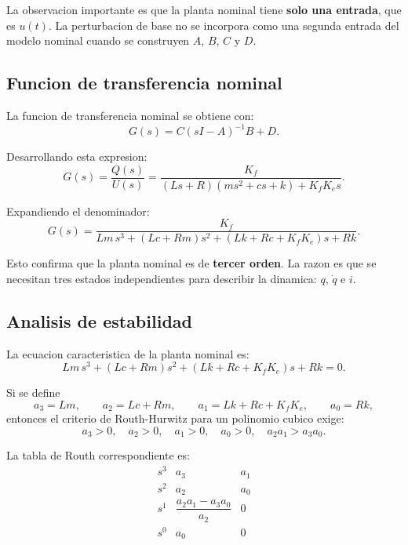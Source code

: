 \documentclass[11pt]{article}
\begin{document}
La observacion importante es que la planta nominal tiene \textbf{solo una entrada}, que es $u(t)$. La perturbacion de base no se incorpora como una segunda entrada del modelo nominal cuando se construyen $A$, $B$, $C$ y $D$.

\subsection{Funcion de transferencia nominal}

La funcion de transferencia nominal se obtiene con:
\begin{equation}
G(s)=C(sI-A)^{-1}B+D.
\end{equation}

Desarrollando esta expresion:
\begin{equation}
G(s)=\frac{Q(s)}{U(s)}
=
\frac{K_f}{(Ls+R)(ms^2+cs+k)+K_fK_e s}.
\label{eq:tf_nominal}
\end{equation}

Expandiendo el denominador:
\begin{equation}
G(s)=
\frac{K_f}
{Lm\,s^3 + (Lc+Rm)s^2 + (Lk+Rc+K_fK_e)s + Rk}.
\end{equation}

Esto confirma que la planta nominal es de \textbf{tercer orden}. La razon es que se necesitan tres estados independientes para describir la dinamica: $q$, $\dot q$ e $i$.

\subsection{Analisis de estabilidad}

La ecuacion caracteristica de la planta nominal es:
\[
Lm\,s^3 + (Lc+Rm)s^2 + (Lk+Rc+K_fK_e)s + Rk = 0.
\]

Si se define
\[
a_3=Lm,\qquad a_2=Lc+Rm,\qquad a_1=Lk+Rc+K_fK_e,\qquad a_0=Rk,
\]
entonces el criterio de Routh-Hurwitz para un polinomio cubico exige:
\begin{equation}
a_3>0,\quad a_2>0,\quad a_1>0,\quad a_0>0,\quad a_2a_1>a_3a_0.
\end{equation}

La tabla de Routh correspondiente es:
\[
\begin{array}{c|cc}
s^3 & a_3 & a_1\\
s^2 & a_2 & a_0\\
s^1 & \dfrac{a_2a_1-a_3a_0}{a_2} & 0\\
s^0 & a_0 & 0
\end{array}
\]
\end{document}

